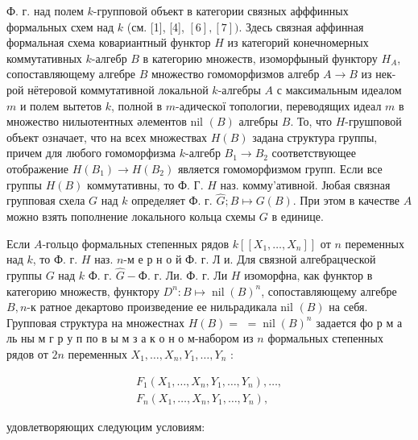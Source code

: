 \documentclass[10pt]{article}
\begin{document}
Ф. г. над полем $k$-групповой объект в категории связных афффинных формальных схем над $k$ (см. [1], [4], $[6],[7])$. Здесь связная аффинная формальная схема ковариантный функтор $H$ из категорий конечномерных коммутативных $k$-алгебр $B$ в категорию множеств, изоморфыный функтору $H_{A}$, сопоставляющему алгебре $B$ множество гомоморфизмов алгебр $A \rightarrow B$ из нек-рой нётеровой коммутативной локальной $k$-алгебры $A$ с максимальным идеалом $m$ и полем вытетов $k$, полной в $m$-адическої топологии, переводящих идеал $m$ в множество нилыотентных әлементов nil $(B)$ алгебры $B$. То, что $H$-грушповой объект означает, что на всех множествах $H(B)$ задана структура группы, причем для любого гомоморфизма $k$-алгебр $B_{1} \rightarrow B_{2}$ соответствующее отображение $H\left(B_{1}\right) \rightarrow H\left(B_{2}\right)$ является гомоморфизмом групп. Если все группы $H(B)$ коммутативны, то Ф. Г. $H$ наз. комму'ативной. Јюбая связная групповая схела $G$ над $k$ определяет Ф. г. $\widehat{G} ; B \longmapsto G(B)$. При этом в качестве $A$ можно взять пополнение локального кольца схемы $G$ в единице.



Если $A$-гольцо формальных степенных рядов $k\left[\left[X_{1}, \ldots, X_{n}\right]\right]$ от $n$ переменных над $k$, то Ф. г. $H$ наз. $n$-м е р н о й Ф. г. Л и. Для связной алгебрацческой группы $G$ над $k$ Ф. г. $\widehat{G}-Ф$. г. Ли. Ф. г. Ли $H$ изоморфна, как функтор в категорию множеств, функтору $D^{n}: B \longmapsto \operatorname{nil}(B)^{n}$, сопоставляющему алгебре $B, n$-к ратное декартово произведение ее нильрадикала nil $(B)$ на себя. Групповая структура на множестнах $H(B)=$ $=\operatorname{nil}(B)^{n}$ задается фо р м а ль ны м г р у п по в ы м з а к о н о м-набором из $n$ формальных степенных рядов от $2 n$ переменных $X_{1}, \ldots, X_{n}, Y_{1}, \ldots, Y_{n}$ :



\[

\begin{gathered}

F_{1}\left(X_{1}, \ldots, X_{n}, Y_{1}, \ldots, Y_{n}\right), \ldots, \\

F_{n}\left(X_{1}, \ldots, X_{n}, Y_{1}, \ldots, Y_{n}\right),

\end{gathered}

\]



удовлетворяющих следуюцим условиям:
\end{document}
